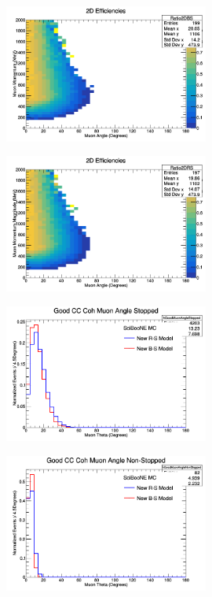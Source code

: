 \documentclass[11pt]{article}
\begin{document}
\begin{figure}[H]
\centering
\includegraphics[width=0.6\textwidth]{ANMCombinedPlotsImages/5-ANMCombinedPlots.png}
\caption{}
\end{figure}

\begin{figure}[H]
\centering
\includegraphics[width=0.6\textwidth]{ANMCombinedPlotsImages/6-ANMCombinedPlots.png}
\caption{}
\end{figure}

\begin{figure}[H]
\centering
\includegraphics[width=0.6\textwidth]{ANMCombinedPlotsImages/7-ANMCombinedPlots.png}
\caption{}
\end{figure}

\begin{figure}[H]
\centering
\includegraphics[width=0.6\textwidth]{ANMCombinedPlotsImages/8-ANMCombinedPlots.png}
\caption{}
\end{figure}
\end{document}

